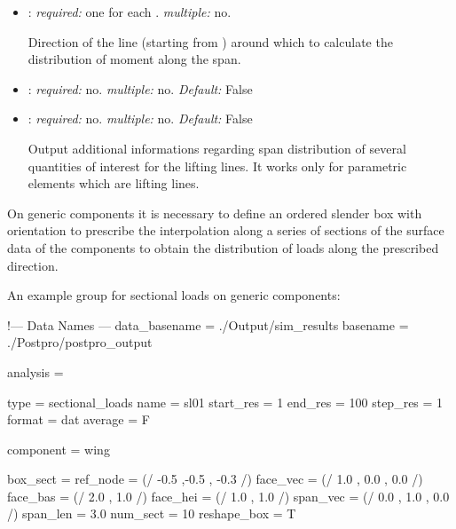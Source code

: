 \begin{itemize}
\item {}: \textit{required:} one for each . \textit{multiple:} no.

Direction of the line (starting from ) around which to calculate the distribution of moment along the span.

\item {}: \textit{required:} no. \textit{multiple:} no. \textit{Default:} False

\item {}: \textit{required:} no. \textit{multiple:} no. \textit{Default:} False

Output additional informations regarding span distribution of several quantities of interest for the lifting lines. It works only for parametric elements which are lifting lines.

\end{itemize}

On generic components it is necessary to define an ordered slender box with orientation to prescribe the interpolation along a series of sections of the surface data of the components to obtain the distribution of loads along the prescribed direction.

An example  group for sectional loads on generic components:

\begin{inputfile}[frame=single, caption={dust\_post.in for sectional load on generic components}, label={file:dust_post.in_sectional_param}]
!--- Data Names ---
data_basename = ./Output/sim_results
basename =     ./Postpro/postpro_output

analysis = {

type = sectional_loads
name = sl01
start_res = 1
end_res   = 100 
step_res  = 1
format = dat
average = F

component = wing

box_sect = {
 ref_node = (/ -0.5 ,-0.5 , -0.3 /)
 face_vec = (/ 1.0 , 0.0 , 0.0 /)
 face_bas = (/ 2.0 , 1.0 /) 
 face_hei = (/ 1.0 , 1.0 /)
 span_vec = (/ 0.0 , 1.0 , 0.0 /)
 span_len = 3.0
 num_sect = 10
 reshape_box = T 
} 


}
\end{inputfile}

